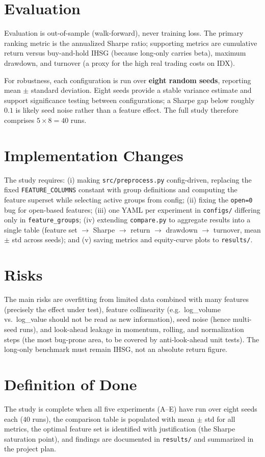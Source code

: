 \documentclass[10pt,twocolumn]{article}
\begin{document}
\section{Evaluation}
Evaluation is out-of-sample (walk-forward), never training loss. The
primary ranking metric is the annualized Sharpe ratio; supporting
metrics are cumulative return versus buy-and-hold IHSG (because
long-only carries beta), maximum drawdown, and turnover (a proxy for the
high real trading costs on IDX).

For robustness, each configuration is run over \textbf{eight random
seeds}, reporting mean $\pm$ standard deviation. Eight seeds provide a
stable variance estimate and support significance testing between
configurations; a Sharpe gap below roughly $0.1$ is likely seed noise
rather than a feature effect. The full study therefore comprises
$5 \times 8 = 40$ runs.

\section{Implementation Changes}
The study requires: (i) making \texttt{src/preprocess.py} config-driven,
replacing the fixed \texttt{FEATURE\_COLUMNS} constant with group
definitions and computing the feature superset while selecting active
groups from config; (ii) fixing the \texttt{open=0} bug for open-based
features; (iii) one YAML per experiment in \texttt{configs/} differing
only in \texttt{feature\_groups}; (iv) extending \texttt{compare.py} to
aggregate results into a single table (feature set $\to$ Sharpe $\to$
return $\to$ drawdown $\to$ turnover, mean $\pm$ std across seeds); and
(v) saving metrics and equity-curve plots to \texttt{results/}.

\section{Risks}
The main risks are overfitting from limited data combined with many
features (precisely the effect under test), feature collinearity (e.g.\
log\_volume vs.\ log\_value should not be read as new information),
seed noise (hence multi-seed runs), and look-ahead leakage in momentum,
rolling, and normalization steps (the most bug-prone area, to be covered
by anti-look-ahead unit tests). The long-only benchmark must remain
IHSG, not an absolute return figure.

\section{Definition of Done}
The study is complete when all five experiments (A--E) have run over
eight seeds each ($40$ runs), the comparison table is populated with
mean $\pm$ std for all metrics, the optimal feature set is identified
with justification (the Sharpe saturation point), and findings are
documented in \texttt{results/} and summarized in the project plan.
\end{document}
